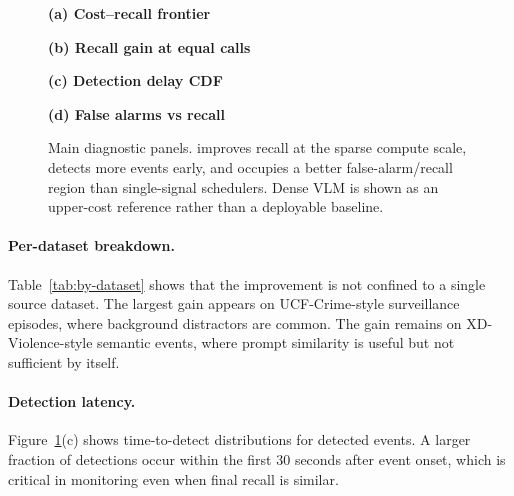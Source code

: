\begin{figure}[t]
\centering
\begin{minipage}{0.47\linewidth}
\centering
{\scriptsize\textbf{(a) Cost--recall frontier}}\\[-0.3em]

\end{minipage}\hfill
\begin{minipage}{0.47\linewidth}
\centering
{\scriptsize\textbf{(b) Recall gain at equal calls}}\\[-0.3em]

\end{minipage}

\vspace{0.35em}
\begin{minipage}{0.47\linewidth}
\centering
{\scriptsize\textbf{(c) Detection delay CDF}}\\[-0.3em]

\end{minipage}\hfill
\begin{minipage}{0.47\linewidth}
\centering
{\scriptsize\textbf{(d) False alarms vs recall}}\\[-0.3em]

\end{minipage}
\caption{Main diagnostic panels. \method{} improves recall at the sparse compute scale, detects more events early, and occupies a better false-alarm/recall region than single-signal schedulers. Dense VLM is shown as an upper-cost reference rather than a deployable baseline.}
\label{fig:main-diagnostics}
\end{figure}

\paragraph{Per-dataset breakdown.}
Table~\ref{tab:by-dataset} shows that the improvement is not confined to a single source dataset. The largest gain appears on UCF-Crime-style surveillance episodes, where background distractors are common. The gain remains on XD-Violence-style semantic events, where prompt similarity is useful but not sufficient by itself.

\begin{table}[t]
\centering
\caption{Per-dataset breakdown at the main budget. Recall values are percentages.}
\label{tab:by-dataset}

\end{table}

\paragraph{Detection latency.}
Figure~\ref{fig:main-diagnostics}(c) shows time-to-detect distributions for detected events. A larger fraction of \method{} detections occur within the first 30 seconds after event onset, which is critical in monitoring even when final recall is similar.

